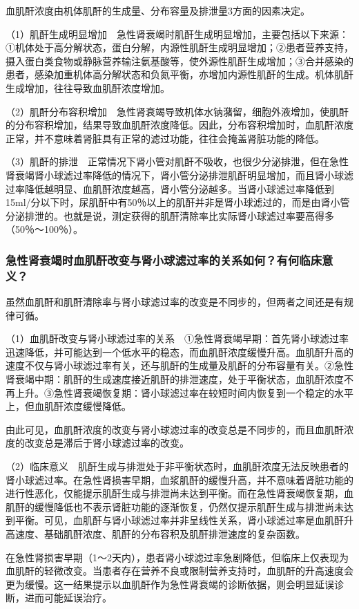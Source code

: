 血肌酐浓度由机体肌酐的生成量、分布容量及排泄量3方面的因素决定。

（1）肌酐生成明显增加　急性肾衰竭时肌酐生成明显增加，主要包括以下来源：①机体处于高分解状态，蛋白分解，内源性肌酐生成明显增加；②患者营养支持，摄入蛋白类食物或静脉营养输注氨基酸等，使外源性肌酐生成增加；③合并感染的患者，感染加重机体高分解状态和负氮平衡，亦增加内源性肌酐的生成。机体肌酐生成增加，往往导致血肌酐浓度增加。

（2）肌酐分布容积增加　急性肾衰竭导致机体水钠潴留，细胞外液增加，使肌酐的分布容积增加，结果导致血肌酐浓度降低。因此，分布容积增加时，血肌酐浓度正常，并不意味着肾脏具有正常的滤过功能，往往会掩盖肾脏功能的降低。

（3）肌酐的排泄　正常情况下肾小管对肌酐不吸收，也很少分泌排泄，但在急性肾衰竭肾小球滤过率降低的情况下，肾小管分泌排泄肌酐明显增加，而且肾小球滤过率降低越明显、血肌酐浓度越高，肾小管分泌越多。当肾小球滤过率降低到15ml/分以下时，尿肌酐中有50％以上的肌酐并非是肾小球滤过的，而是由肾小管分泌排泄的。也就是说，测定获得的肌酐清除率比实际肾小球滤过率要高得多（50％～100％）。

\subsubsection{急性肾衰竭时血肌酐改变与肾小球滤过率的关系如何？有何临床意义？}

虽然血肌酐和肌酐清除率与肾小球滤过率的改变是不同步的，但两者之间还是有规律可循。

（1）血肌酐改变与肾小球滤过率的关系　①急性肾衰竭早期：首先肾小球滤过率迅速降低，并可能达到一个低水平的稳态，而血肌酐浓度缓慢升高。血肌酐升高的速度不仅与肾小球滤过率有关，还与肌酐的生成量及肌酐的分布容量有关。②急性肾衰竭中期：肌酐的生成速度接近肌酐的排泄速度，处于平衡状态，血肌酐浓度不再上升。③急性肾衰竭恢复期：肾小球滤过率在较短时间内恢复到一个稳定的水平上，但血肌酐浓度缓慢降低。

由此可见，血肌酐浓度的改变与肾小球滤过率的改变总是不同步的，而且血肌酐浓度的改变总是滞后于肾小球滤过率的改变。

（2）临床意义　肌酐生成与排泄处于非平衡状态时，血肌酐浓度无法反映患者的肾小球滤过率。在急性肾损害早期，血浆肌酐的缓慢升高，并不意味着肾脏功能的进行性恶化，仅能提示肌酐生成与排泄尚未达到平衡。而在急性肾衰竭恢复期，血肌酐的缓慢降低也不表示肾脏功能的逐渐恢复，仍然仅提示肌酐生成与排泄尚未达到平衡。可见，血肌酐与肾小球滤过率并非呈线性关系，肾小球滤过率是血肌酐升高速度、基础肌酐浓度、肌酐的分布容积及肌酐排泄速度的复杂函数。

在急性肾损害早期（1～2天内），患者肾小球滤过率急剧降低，但临床上仅表现为血肌酐的轻微改变。当患者存在营养不良或限制营养支持时，血肌酐的升高速度会更为缓慢。这一结果提示以血肌酐作为急性肾衰竭的诊断依据，则会明显延误诊断，进而可能延误治疗。

